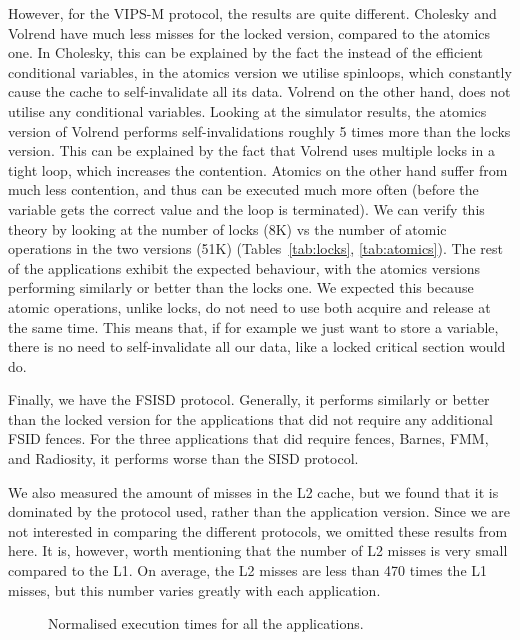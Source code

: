 However, for the VIPS-M protocol, the results are quite different. Cholesky and
Volrend have much less misses for the locked version, compared to the atomics
one. In Cholesky, this can be explained by the fact the instead of the efficient
conditional variables, in the atomics version we utilise spinloops, which
constantly cause the cache to self-invalidate all its data. Volrend on the other
hand, does not utilise any conditional variables. Looking at the simulator
results, the atomics version of Volrend performs self-invalidations roughly 5
times more than the locks version.  This can be explained by the fact that
Volrend uses multiple locks in a tight loop, which increases the contention.
Atomics on the other hand suffer from much less contention, and thus can be
executed much more often (before the variable gets the correct value and the
loop is terminated). We can verify this theory by looking at the number of locks
(8K) vs the number of atomic operations in the two versions (51K)
(Tables~\ref{tab:locks}, \ref{tab:atomics}). The rest of the applications
exhibit the expected behaviour, with the atomics versions performing similarly
or better than the locks one. We expected this because atomic operations, unlike
locks, do not need to use both acquire and release at the same time. This means
that, if for example we just want to store a variable, there is no need to
self-invalidate all our data, like a locked critical section would do.

Finally, we have the FSISD protocol. Generally, it performs similarly or better
than the locked version for the applications that did not require any additional
FSID fences. For the three applications that did require fences, Barnes, FMM,
and Radiosity, it performs worse than the SISD protocol.

We also measured the amount of misses in the L2 cache, but we found that it is
dominated by the protocol used, rather than the application version.  Since we
are not interested in comparing the different protocols, we omitted these
results from here. It is, however, worth mentioning that the number of L2 misses
is very small compared to the L1. On average, the L2 misses are less than 470
times the L1 misses, but this number varies greatly with each application.


\begin{figure}
	\caption{Normalised execution times for all the applications.}
	\label{fig:res_time}
\end{figure}

